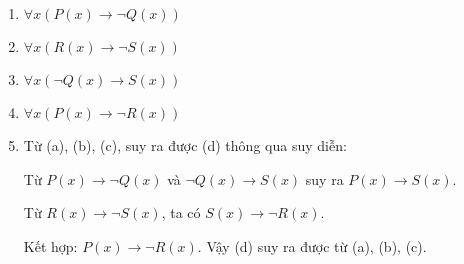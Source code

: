 \documentclass[12pt]{article}
\begin{document}
\begin{enumerate}[label=\alph*)]
\item $\forall x (P(x) \rightarrow \neg Q(x))$
\item $\forall x (R(x) \rightarrow \neg S(x))$
\item $\forall x (\neg Q(x) \rightarrow S(x))$
\item $\forall x (P(x) \rightarrow \neg R(x))$
\item Từ (a), (b), (c), suy ra được (d) thông qua suy diễn:

Từ $P(x) \rightarrow \neg Q(x)$ và $\neg Q(x) \rightarrow S(x)$ suy ra $P(x) \rightarrow S(x)$.

Từ $R(x) \rightarrow \neg S(x)$, ta có $S(x) \rightarrow \neg R(x)$.

Kết hợp: $P(x) \rightarrow \neg R(x)$. Vậy (d) suy ra được từ (a), (b), (c).
\end{enumerate}
\end{document}
